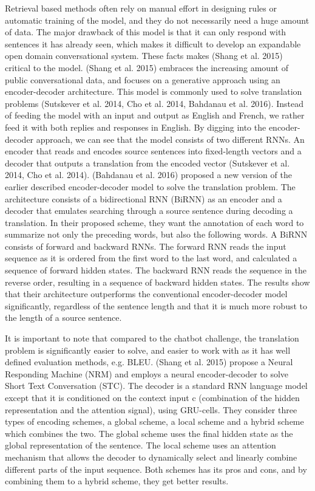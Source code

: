 \documentclass{article} %
\begin{document}
Retrieval based methods often rely on manual effort in designing rules or  automatic training of the model, and they do not necessarily need a huge amount of data. The major drawback of this model is that it can only respond with sentences it has already seen, which makes it difficult to develop an expandable open domain conversational system. These facts makes (Shang et al. 2015) critical to the model. (Shang et al. 2015) embraces the increasing amount of public conversational data, and focuses on a generative approach using an encoder-decoder architecture. This model is commonly used to solve translation problems (Sutskever et al. 2014, Cho et al. 2014, Bahdanau et al. 2016). Instead of feeding the model with an input and output as English and French, we rather feed it with both replies and  responses in English. By digging into the encoder-decoder approach, we can see that the model consists of two different RNNs. An encoder that reads and encodes source sentences into fixed-length vectors and a decoder that outputs a translation from the encoded vector (Sutskever et al. 2014, Cho et al. 2014). (Bahdanau et al. 2016) proposed a new version of the earlier described encoder-decoder model to solve the translation problem. The architecture consists of a bidirectional RNN (BiRNN) as an encoder and a decoder that emulates searching through a source sentence during decoding a translation. In their proposed scheme, they want the annotation of each word to summarize not only the preceding words, but also the following words. A BiRNN consists of forward and backward RNNs. The forward RNN reads the input sequence as it is ordered from the first word to the last word, and calculated a sequence of forward hidden states. The backward RNN reads the sequence in the reverse order, resulting in a sequence of backward hidden states. The results show that their architecture outperforms the conventional encoder-decoder model significantly, regardless of the sentence length and that it is much more robust to the length of a source sentence.

It is important to note that compared to the chatbot challenge, the translation problem is significantly easier to solve, and easier to work with as it has well defined evaluation methods, e.g. BLEU. (Shang et al. 2015) propose a Neural Responding Machine (NRM) and employs a neural encoder-decoder to solve Short Text Conversation (STC). The decoder is a standard RNN language model except that it is conditioned on the context input c (combination of the hidden representation and the attention signal), using GRU-cells. They consider three types of encoding schemes, a global scheme, a local scheme and a hybrid scheme which combines the two. The global scheme uses the final hidden state as the global representation of the sentence. The local scheme uses an attention mechanism that allows the decoder to dynamically select and linearly combine different parts of the input sequence. Both schemes has its pros and cons, and by combining them to a hybrid scheme, they get better results. 
\end{document}
